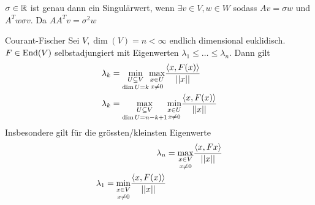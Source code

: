 $\sigma \in \mathbb{R}$ ist genau dann ein Singulärwert, wenn $\exists v \in V, w \in W$ sodass $Av = \sigma w$ und $A^Tw  \sigma v$. Da $AA^Tv = \sigma^2 w$



\begin{satz}{Courant-Fischer}
    Sei $V, \dim(V) = n < \infty$ endlich dimensional euklidisch. $F \in \operatorname{End}(V)$ selbstadjungiert mit Eigenwerten $\lambda_1 \leq \ldots \leq \lambda_n$. Dann gilt
    \begin{align*}
        \lambda_k &= \underset{\dim U = k}{\underset{U \subseteq V}{\min}} \underset{x \neq 0}{\underset{x \in U}{\max}} \frac{\left<x,F(x)\right>}{\vert\vert x\vert\vert}\\
        \lambda_k &= \underset{\dim U = n-k+1}{\underset{U \subseteq V}{\max}} \underset{x \neq 0}{\underset{x \in U}{\min}} \frac{\left<x,F(x)\right>}{\vert\vert x\vert\vert}
    \end{align*} 
    Insbesondere gilt für die grössten/kleinsten Eigenwerte
    \begin{align*}
        \lambda_n &= \underset{x \neq 0}{\underset{x \in V}{\max}} \frac{\left<x,Fx\right>}{\vert\vert x\vert\vert}\\
        \lambda_1 = \underset{x \neq 0}{\underset{x \in V}{\min}} \frac{\left<x,F(x)\right>}{\vert\vert x\vert\vert}
    \end{align*}
\end{satz}
